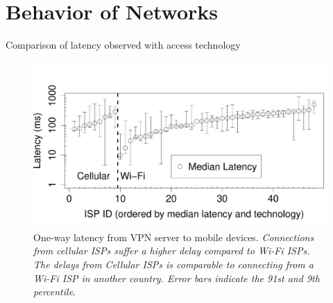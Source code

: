 \section{Behavior of Networks}

Comparison of latency observed with access technology 

\begin{figure}[t]
\includegraphics[width=\columnwidth]{plots/latency_isp_whisker.pdf}
\caption{One-way latency from VPN server to mobile devices. \emph{Connections from cellular ISPs suffer a higher delay compared to Wi-Fi ISPs. The delays from Cellular ISPs is comparable to connecting from a Wi-Fi ISP in another country. Error bars indicate the 91st and 9th percentile}.}
\label{fig:latency-across-isps}
\end{figure}




